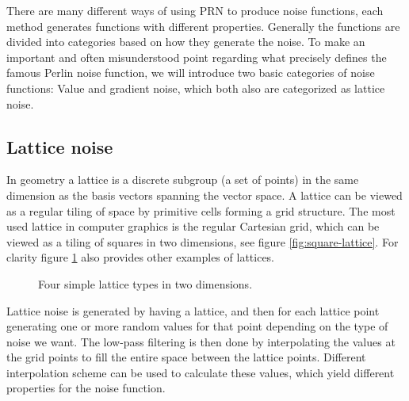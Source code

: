 There are many different ways of using PRN to produce noise functions,
each method generates functions with different properties. Generally the
functions are divided into categories based on how they generate the
noise. To make an important and often misunderstood point regarding
what precisely defines the famous Perlin noise function, we will
introduce two basic categories of noise functions: Value and gradient
noise, which both also are categorized as lattice noise.


\subsection{Lattice noise}
In geometry a lattice is a discrete subgroup (a set of points) in the
same dimension as the basis vectors spanning the vector space. A
lattice can be viewed as a regular tiling of space by primitive cells
forming a grid structure. The most used lattice in computer graphics is the
regular Cartesian grid, which can be viewed as a tiling of
squares in two dimensions, see figure \ref{fig:square-lattice}. For
clarity figure \ref{fig:lattices} also provides other examples of
lattices.

\begin{figure}[!h]
  \centering
  \hspace{4mm}
  \hspace{4mm}
  \hspace{4mm}
  \caption{Four simple lattice types in two dimensions.}
  \label{fig:lattices}
\end{figure}

Lattice noise is generated by having a lattice, and then for each
lattice point generating one or more random values for that point
depending on the type of noise we want.
%
The low-pass filtering is then done by interpolating the values at the
grid points to fill the entire space between the lattice
points. Different interpolation scheme can be used to calculate these
values, which yield different properties for the noise function.

